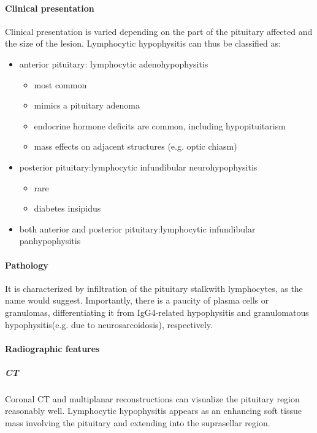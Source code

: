 \paragraph{Clinical presentation}

Clinical presentation is varied depending on the part of the pituitary affected and the size of the lesion. Lymphocytic hypophysitis can thus be classified as:

\begin{itemize}
	\item
	anterior pituitary: lymphocytic adenohypophysitis
	
	\begin{itemize}
		\item
		most common
		\item
		mimics a pituitary adenoma
		\item
		endocrine hormone deficits are common, including hypopituitarism
		\item
		mass effects on adjacent structures (e.g. optic chiasm)
	\end{itemize}
	\item
	posterior pituitary:lymphocytic infundibular neurohypophysitis
	
	\begin{itemize}
		\item
		rare
		\item
		diabetes insipidus
	\end{itemize}
	\item
	both anterior and posterior pituitary:lymphocytic infundibular panhypophysitis
\end{itemize}

\paragraph{Pathology}

It is characterized by infiltration of the pituitary stalkwith lymphocytes, as the name would suggest. Importantly, there is a paucity of plasma cells or granulomas, differentiating it from IgG4-related hypophysitis and granulomatous hypophysitis(e.g. due to neurosarcoidosis), respectively.

\paragraph{Radiographic features}


\subparagraph{CT}

Coronal CT and multiplanar reconstructions can visualize the pituitary region reasonably well. Lymphocytic hypophysitis appears as an enhancing soft tissue mass involving the pituitary and extending into the suprasellar region.


